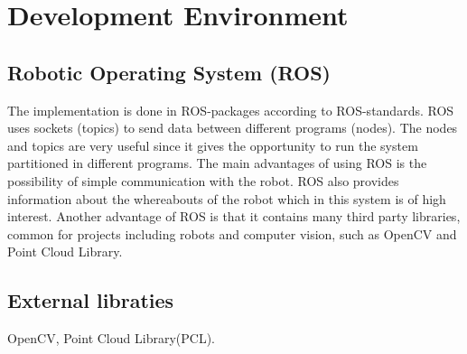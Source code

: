 
\section{Development Environment}

\subsection{Robotic Operating System (ROS)}
The implementation is done in ROS-packages according to ROS-standards. ROS uses sockets (topics) to send data between different programs (nodes). The nodes and topics are very useful since it gives the opportunity to run the system partitioned in different programs. The main advantages of using ROS is the possibility of simple communication with the robot. ROS also provides information about the whereabouts of the robot which in this system is of high interest. Another advantage of ROS is that it contains many third party libraries, common for projects including robots and computer vision, such as OpenCV and Point Cloud Library.  

\subsection{External libraties}
OpenCV, Point Cloud Library(PCL).